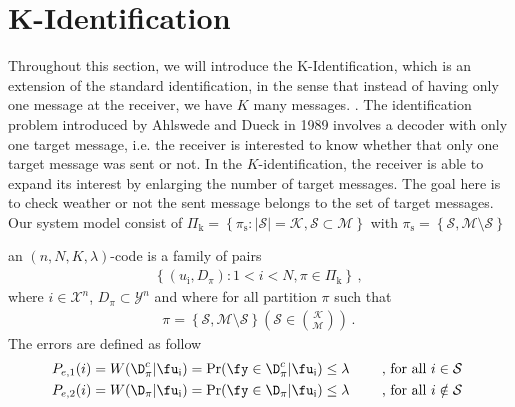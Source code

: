 \chapter{K-Identification}
\label{K-ID-Chapter}
Throughout this section, we will introduce the K-Identification, which is an extension of the standard identification, in the sense that instead of having only one message at the receiver, we have $K$ many messages. \cite{Ahlswede08,Yamamoto14}. The identification problem introduced by Ahlswede and Dueck in 1989 \cite{AD89,Ahlswede21_Book} involves a decoder with only one target message, i.e. the receiver is interested to know whether that only one target message was sent or not. In the $K$-identification, the receiver is able to expand its interest by enlarging the number of target messages. The goal here is to check weather or not the sent message belongs to the set of target messages.
Our system model consist of $\Pi_{\text{k}} = \left\{ \pi_{\text{s}}:\lvert \mathcal{S} \lvert=\mathcal{K}, \mathcal{S}\subset \mathcal{M} \right\}$ with $\pi_{\text{s}}=\left\{ \mathcal{S}, \mathcal{M} \setminus \mathcal{S} \right\}$
\begin{definition}
an $(n, N, K,\lambda)$-code is a family of pairs
\begin{align}
    \left\{(u_{\text{i}},D_\pi):1 < i < N ,\pi \in \Pi_{\text{k}} \right\} \,,\,    
\end{align}
where $i\in \mathcal{X}^ n$, $D_\pi \subset \mathcal{Y}^ n$ and where for all partition $\pi$ such that
\begin{align}
    \pi=\left\{\mathcal{S},\mathcal{M} \setminus \mathcal{S}\right\} \left( \mathcal{S}\in \binom{\mathcal{K}}{\mathcal{M}} \right) \,.\,
\end{align}
The errors are defined as follow 
\begin{align}
    P_{e,1}(i) = W(\D_\pi^c|\fu_{\text{i}}) = \Pr(\fy\in\D_\pi^c|\fu_{\text{i}}) \leq \lambda \qquad \text{     , for all $i\in \mathcal{S}$ } \\
    \label{type2.k}
     P_{e,2}(i) = W(\D_\pi|\fu_{\text{i}}) = \Pr(\fy\in\D_\pi|\fu_{\text{i}}) \leq \lambda \qquad \text{    , for all $i\notin \mathcal{S}$ }
\end{align}
\end{definition}

